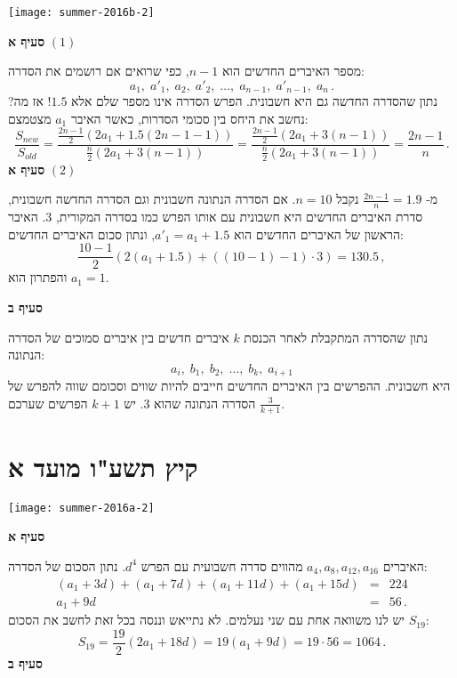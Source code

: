 \begin{center}
\texttt{[image: summer-2016b-2]}
\end{center}
\vspace{-1ex}

\textbf{סעיף א}
$(1)$

מספר האיברים החדשים הוא
$n-1$,
כפי שרואים אם רושמים את הסדרה:
\[
a_1,\; a'_1,\; a_2,\; a'_2,\; \ldots,\; a_{n-1},\; a'_{n-1},\; a_n\,.
\]
נתון שהסדרה החדשה גם היא חשבונית. הפרש הסדרה אינו מספר שלם אלא
$1.5$!
אז מה? נחשב את היחס בין סכומי הסדרות, כאשר האיבר
$a_1$
מצטמצם:
\[
\frac{S_{\mathit{new}}}{S_{\mathit{old}}}= \frac{\displaystyle\frac{2n-1}{2}(2a_1+1.5(2n-1-1))}{\displaystyle\frac{n}{2}(2a_1+3(n-1))}=\frac{\displaystyle\frac{2n-1}{2}(2a_1+3(n-1))}{\displaystyle\frac{n}{2}(2a_1+3(n-1))}=\frac{2n-1}{n}\,.
\]
\textbf{סעיף א}
$(2)$

מ-%
$\displaystyle\frac{2n-1}{n}=1.9$
נקבל
$n=10$. 
אם הסדרה הנתונה חשבונית וגם הסדרה החדשה חשבונית, סדרת האיברים החדשים היא חשבונית עם אותו הפרש כמו בסדרה המקורית, 
$3$.
%
האיבר הראשון של האיברים החדשים הוא
$a'_1=a_1+1.5$,
ונתון סכום האיברים החדשים:
\[
\frac{10-1}{2}(2(a_1+1.5)+((10-1)-1)\cdot 3) = 130.5\,,
\]
והפתרון הוא
$a_1=1$.

\textbf{סעיף ב}

נתון שהסדרה המתקבלת לאחר הכנסת
$k$
איברים חדשים בין איברים סמוכים של הסדרה הנתונה:
\[
a_i,\; b_1,\; b_2,\; \ldots,\; b_k,\; a_{i+1}
\]
היא חשבונית. ההפרשים בין האיברים החדשים חייבים להיות שווים וסכומם שווה להפרש של הסדרה הנתונה שהוא
$3$.
יש
$k+1$
הפרשים שערכם
$\displaystyle\frac{3}{k+1}$.


\np
\section{קיץ תשע"ו מועד א}

\begin{center}
\texttt{[image: summer-2016a-2]}
\end{center}
\vspace{-4ex}

\textbf{סעיף א}

האיברים
$a_4,a_8,a_{12},a_{16}$
מהווים סדרה חשבועית עם הפרש
$d^4$.
נתון הסכום של הסדרה:
\begin{eqnarray*}
(a_1+3d)+(a_1+7d)+(a_1+11d)+(a_1+15d)&=&224\\
a_1+9d&=&56\,.
\end{eqnarray*}
יש לנו משוואה אחת עם שני נעלמים. לא נתייאש וננסה בכל זאת לחשב את הסכום
$S_{19}$:
\[
S_{19}=\frac{19}{2}(2a_1+18d) = 19(a_1+9d)=19\cdot 56 = 1064\,.
\]
\vspace{-1ex}
\textbf{סעיף ב}


